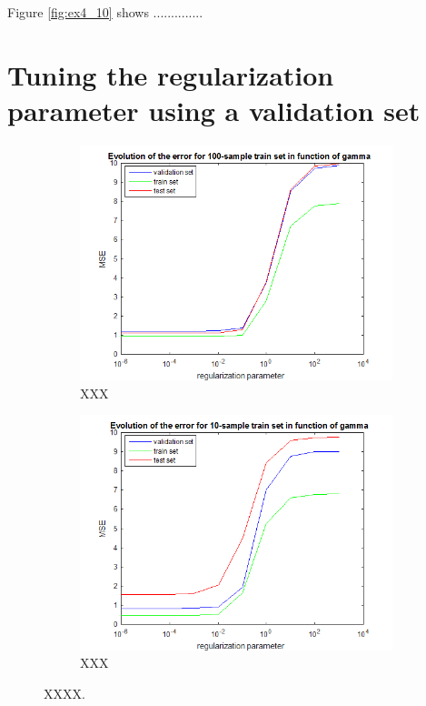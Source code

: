\documentclass{article} %
\begin{document}
Figure \ref{fig:ex4_10} shows ..............


\section{Tuning the regularization parameter using a validation set}
 \begin{figure}[h]
\center
 \begin{subfigure}[b]{0.45\textwidth}
        \includegraphics[width=\textwidth]{5_100}
        \caption{XXX}
    \end{subfigure}
    \begin{subfigure}[b]{0.45\textwidth}
        \includegraphics[width=\textwidth]{5_10}
        \caption{XXX}
    \end{subfigure}
    \caption{XXXX.}
    \label{fig:ex5}
\end{figure}
\end{document}

